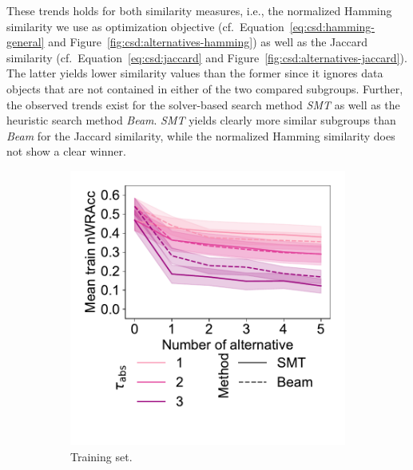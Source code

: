 \documentclass{article}
\theoremstyle{definition}
\begin{document}
These trends holds for both similarity measures, i.e., the normalized Hamming similarity we use as optimization objective (cf.~Equation~\ref{eq:csd:hamming-general} and Figure~\ref{fig:csd:alternatives-hamming}) as well as the Jaccard similarity (cf.~Equation~\ref{eq:csd:jaccard} and Figure~\ref{fig:csd:alternatives-jaccard}).
The latter yields lower similarity values than the former since it ignores data objects that are not contained in either of the two compared subgroups.
Further, the observed trends exist for the solver-based search method \emph{SMT} as well as the heuristic search method \emph{Beam}.
\emph{SMT} yields clearly more similar subgroups than \emph{Beam} for the Jaccard similarity, while the normalized Hamming similarity does not show a clear winner.

\begin{figure}[t]
	\centering
	\begin{subfigure}[t]{0.48\textwidth}
		\centering
		\includegraphics[width=\textwidth, trim=15 50 15 15, clip]{plots/csd-alternatives-train-nwracc.pdf}
		\caption{Training set.}
		\label{fig:csd:alternatives-train-nwracc}
	\end{subfigure}
	\hfill
	\begin{subfigure}[t]{0.48\textwidth}
		\centering

\end{subfigure}
\end{figure}
\end{document}
